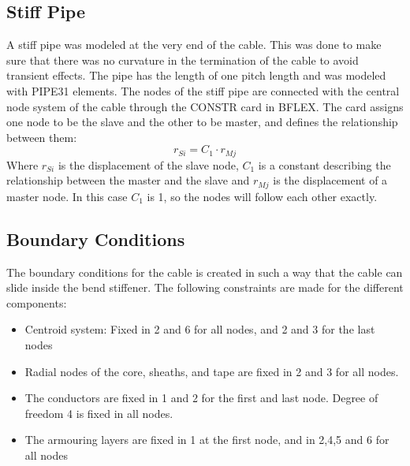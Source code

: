 \subsection{Stiff Pipe}
A stiff pipe was modeled at the very end of the cable. This was done to make sure that there was no curvature in the termination of the cable to avoid transient effects. The pipe has the length of one pitch length and was modeled with PIPE31 elements. The nodes of the stiff pipe are connected with the central node system of the cable through the CONSTR card in BFLEX. The card assigns one node to be the slave and the other to be master, and defines the relationship between them:
\begin{equation}
r_{Si}=C_1 \cdot r_{Mj}    
\end{equation}
Where $r_{Si}$ is the displacement of the slave node,  $C_1$ is a constant describing the relationship between the master and the slave and $r_{Mj}$ is the displacement of a master node.\newline 
\newline 
In this case $C_1$ is 1, so the nodes will follow each other exactly. 

\subsection{Boundary Conditions}
The boundary conditions for the cable is created in such a way that the cable can slide inside the bend stiffener. The following constraints are made for the different components:
\begin{itemize}
    \item Centroid system: Fixed in 2 and 6 for all nodes, and 2 and 3 for the last nodes
    \item Radial nodes of the core, sheaths, and tape are fixed in 2 and 3 for all nodes. 
    \item The conductors are fixed in 1 and 2 for the first and last node. Degree of freedom 4 is fixed in all nodes.
    \item The armouring layers are fixed in 1 at the first node, and in 2,4,5 and 6 for all nodes
\end{itemize}
